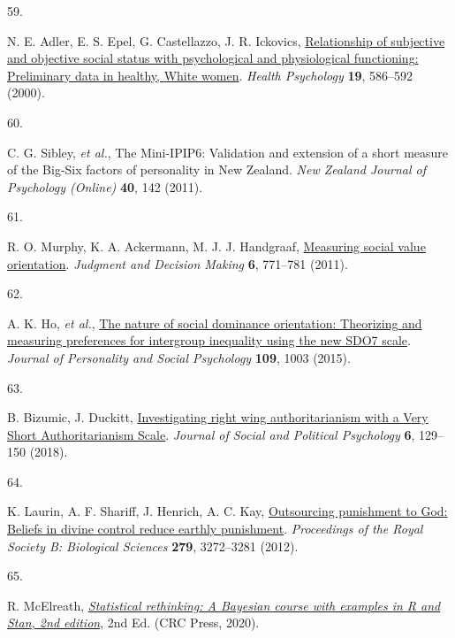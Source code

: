 \documentclass[
  man, donotrepeattitle,floatsintext]{apa6}
\newlength{\cslhangindent}
\newlength{\csllabelwidth}
\newlength{\cslentryspacingunit} %
\newenvironment{CSLReferences}[2] %
 {%
  \setlength{\parindent}{0pt}
  \ifodd #1
  \let\oldpar\par
  \def\par{\hangindent=\cslhangindent\oldpar}
  \fi
  \setlength{\parskip}{#2\cslentryspacingunit}
 }%
 {}
\newcommand{\CSLLeftMargin}[1]{\parbox[t]{\csllabelwidth}{#1}}
\newcommand{\CSLRightInline}[1]{\parbox[t]{\linewidth - \csllabelwidth}{#1}\break}
\begin{document}
\begin{CSLReferences}{0}{0}
\leavevmode{}%
\CSLLeftMargin{59. }%
\CSLRightInline{N. E. Adler, E. S. Epel, G. Castellazzo, J. R. Ickovics, \href{https://doi.org/10.1037/0278-6133.19.6.586}{Relationship of subjective and objective social status with psychological and physiological functioning: Preliminary data in healthy, {W}hite women}. \emph{Health Psychology} \textbf{19}, 586--592 (2000).}

\leavevmode{}%
\CSLLeftMargin{60. }%
\CSLRightInline{C. G. Sibley, \emph{et al.}, The {M}ini-{IPIP}6: Validation and extension of a short measure of the {B}ig-{S}ix factors of personality in {N}ew {Z}ealand. \emph{New Zealand Journal of Psychology (Online)} \textbf{40}, 142 (2011).}

\leavevmode{}%
\CSLLeftMargin{61. }%
\CSLRightInline{R. O. Murphy, K. A. Ackermann, M. J. J. Handgraaf, \href{https://doi.org/10.1017/S1930297500004204}{Measuring social value orientation}. \emph{Judgment and Decision Making} \textbf{6}, 771--781 (2011).}

\leavevmode{}%
\CSLLeftMargin{62. }%
\CSLRightInline{A. K. Ho, \emph{et al.}, \href{https://doi.org/10.1037/pspi0000033}{The nature of social dominance orientation: Theorizing and measuring preferences for intergroup inequality using the new SDO7 scale}. \emph{Journal of Personality and Social Psychology} \textbf{109}, 1003 (2015).}

\leavevmode{}%
\CSLLeftMargin{63. }%
\CSLRightInline{B. Bizumic, J. Duckitt, \href{https://doi.org/10.5964/jspp.v6i1.835}{Investigating right wing authoritarianism with a {V}ery {S}hort {A}uthoritarianism {S}cale}. \emph{Journal of Social and Political Psychology} \textbf{6}, 129--150 (2018).}

\leavevmode{}%
\CSLLeftMargin{64. }%
\CSLRightInline{K. Laurin, A. F. Shariff, J. Henrich, A. C. Kay, \href{https://doi.org/10.1098/rspb.2012.0615}{Outsourcing punishment to {God}: Beliefs in divine control reduce earthly punishment}. \emph{Proceedings of the Royal Society B: Biological Sciences} \textbf{279}, 3272--3281 (2012).}

\leavevmode{}%
\CSLLeftMargin{65. }%
\CSLRightInline{R. McElreath, \emph{\href{http://xcelab.net/rm/statistical-rethinking/}{Statistical rethinking: A {Bayesian} course with examples in {R} and {Stan}, 2nd edition}}, 2nd Ed. (CRC Press, 2020).}


\end{CSLReferences}
\end{document}
